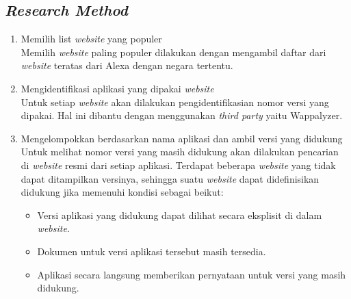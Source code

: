 \subsection{\textit{Research Method}}
\begin{enumerate}
    \item Memilih list \textit{website} yang populer\\
    Memilih \textit{website} paling populer dilakukan dengan mengambil daftar dari \textit{website} teratas dari Alexa dengan negara tertentu.
    \item Mengidentifikasi aplikasi yang dipakai \textit{website}\\
    Untuk setiap \textit{website} akan dilakukan pengidentifikasian nomor versi yang dipakai. Hal ini dibantu dengan menggunakan \textit{third party} yaitu Wappalyzer. 
    \item Mengelompokkan berdasarkan nama aplikasi dan ambil versi yang didukung\\
    Untuk melihat nomor versi yang masih didukung akan dilakukan pencarian di \textit{website} resmi dari setiap aplikasi. Terdapat beberapa \textit{website} yang tidak dapat ditampilkan versinya, sehingga suatu \textit{website} dapat didefinisikan didukung jika memenuhi kondisi sebagai beikut:
    \begin{itemize}
        \item Versi aplikasi yang didukung dapat dilihat secara eksplisit di dalam \textit{website}.
        \item Dokumen untuk versi aplikasi tersebut masih tersedia.
        \item Aplikasi secara langsung memberikan pernyataan untuk versi yang masih didukung.
    \end{itemize}
    

\end{enumerate}
